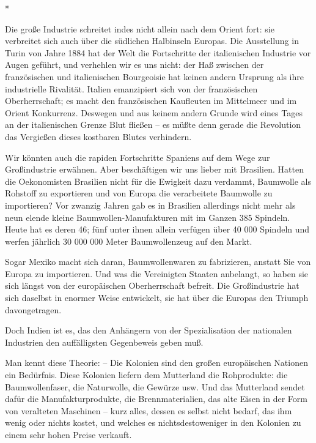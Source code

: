 \documentclass{scrbook}
\begin{document}
\begin{center}*\end{center}

Die große Industrie schreitet indes nicht allein nach dem Orient fort: sie verbreitet sich auch über die südlichen Halbinseln Europas. Die Ausstellung in Turin von Jahre 1884 hat der Welt die Fortschritte der italienischen Industrie vor Augen geführt, und verhehlen wir es uns nicht: der Haß zwischen der französischen und italienischen Bourgeoisie hat keinen andern Ursprung als ihre industrielle Rivalität. Italien emanzipiert sich von der französischen Oberherrschaft; es macht den französischen Kaufleuten im Mittelmeer und im Orient Konkurrenz. Deswegen und aus keinem andern Grunde wird eines Tages an der italienischen Grenze Blut fließen – es müßte denn gerade die Revolution das Vergießen dieses kostbaren Blutes verhindern.

Wir könnten auch die rapiden Fortschritte Spaniens auf dem Wege zur Großindustrie erwähnen. Aber beschäftigen wir uns lieber mit Brasilien. Hatten die Oekonomisten Brasilien nicht für die Ewigkeit dazu verdammt, Baumwolle als Rohstoff zu exportieren und von Europa die verarbeitete Baumwolle zu importieren? Vor zwanzig Jahren gab es in Brasilien allerdings nicht mehr als neun elende kleine Baumwollen-Manufakturen mit im Ganzen 385 Spindeln. Heute hat es deren 46; fünf unter ihnen allein verfügen über 40 000 Spindeln und werfen jährlich 30 000 000 Meter Baumwollenzeug auf den Markt.

Sogar Mexiko macht sich daran, Baumwollenwaren zu fabrizieren, anstatt Sie von Europa zu importieren. Und was die Vereinigten Staaten anbelangt, so haben sie sich längst von der europäischen Oberherrschaft befreit. Die Großindustrie hat sich daselbst in enormer Weise entwickelt, sie hat über die Europas den Triumph davongetragen.

Doch Indien ist es, das den Anhängern von der Spezialisation der nationalen Industrien den auffälligsten Gegenbeweis geben muß.

Man kennt diese Theorie: – Die Kolonien sind den großen europäischen Nationen ein Bedürfnis. Diese Kolonien liefern dem Mutterland die Rohprodukte: die Baumwollenfaser, die Naturwolle, die Gewürze usw. Und das Mutterland sendet dafür die Manufakturprodukte, die Brennmaterialien, das alte Eisen in der Form von veralteten Maschinen – kurz alles, dessen es selbst nicht bedarf, das ihm wenig oder nichts kostet, und welches es nichtsdestoweniger in den Kolonien zu einem sehr hohen Preise verkauft.
\end{document}

